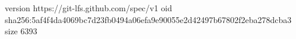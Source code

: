 version https://git-lfs.github.com/spec/v1
oid sha256:5af4f4da4069bc7d23fb0494a06efa9e90055e2d42497b67802f2eba278dcba3
size 6393

